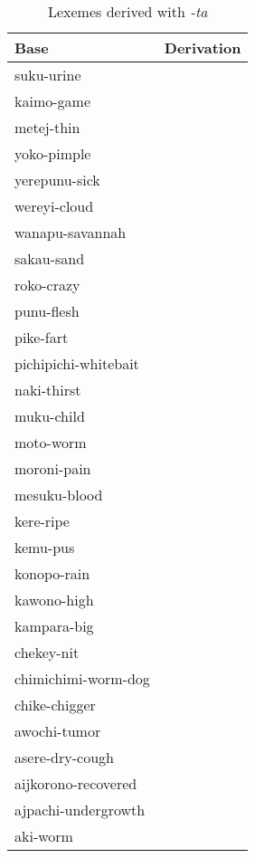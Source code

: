 \documentclass{memoir}
\begin{document}
\begin{table}
\caption{Lexemes derived with \emph{-ta}}
\label{tab:tavbz}
\centering
\begin{tabular}{ll}
\toprule
                Base & Derivation \\
\midrule
          suku-urine &            \\
          kaimo-game &            \\
          metej-thin &            \\
         yoko-pimple &            \\
       yerepunu-sick &            \\
        wereyi-cloud &            \\
     wanapu-savannah &            \\
          sakau-sand &            \\
          roko-crazy &            \\
          punu-flesh &            \\
           pike-fart &            \\
pichipichi-whitebait &            \\
         naki-thirst &            \\
          muku-child &            \\
           moto-worm &            \\
         moroni-pain &            \\
        mesuku-blood &            \\
           kere-ripe &            \\
            kemu-pus &            \\
         konopo-rain &            \\
         kawono-high &            \\
         kampara-big &            \\
          chekey-nit &            \\
 chimichimi-worm-dog &            \\
       chike-chigger &            \\
        awochi-tumor &            \\
     asere-dry-cough &            \\
 aijkorono-recovered &            \\
 ajpachi-undergrowth &            \\
            aki-worm &            \\
\bottomrule
\end{tabular}

\end{table}
\end{document}
